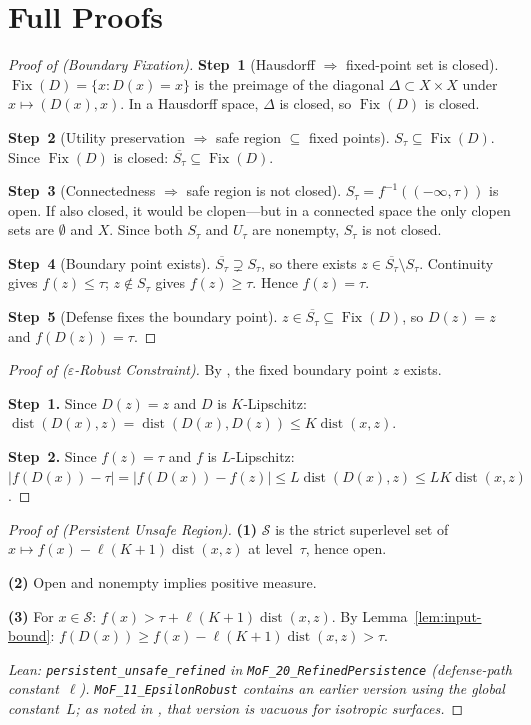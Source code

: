 \documentclass[11pt]{article}
\newcommand{\cl}[1]{\overline{#1}}
\newcommand{\Fix}{\operatorname{Fix}}
\newcommand{\dist}{\operatorname{dist}}
\begin{document}
\section{Full Proofs}
\label{app:proofs}

\begin{proof}[Proof of  (Boundary Fixation)]
\textbf{Step~1} (Hausdorff $\Rightarrow$ fixed-point set is closed).
$\Fix(D) = \{x : D(x) = x\}$ is the preimage of the diagonal
$\Delta \subset X \times X$ under $x \mapsto (D(x), x)$. In a
Hausdorff space, $\Delta$ is closed, so $\Fix(D)$ is closed.

\textbf{Step~2} (Utility preservation $\Rightarrow$ safe region
$\subseteq$ fixed points).
$S_\tau \subseteq \Fix(D)$. Since $\Fix(D)$ is closed:
$\cl{S_\tau} \subseteq \Fix(D)$.

\textbf{Step~3} (Connectedness $\Rightarrow$ safe region is not closed).
$S_\tau = f^{-1}((-\infty,\tau))$ is open. If also closed, it would be
clopen---but in a connected space the only clopen sets are $\emptyset$
and $X$. Since both $S_\tau$ and $U_\tau$ are nonempty, $S_\tau$ is not
closed.

\textbf{Step~4} (Boundary point exists).
$\cl{S_\tau} \supsetneq S_\tau$, so there exists
$z \in \cl{S_\tau} \setminus S_\tau$. Continuity gives
$f(z) \leq \tau$; $z \notin S_\tau$ gives $f(z) \geq \tau$. Hence
$f(z) = \tau$.

\textbf{Step~5} (Defense fixes the boundary point).
$z \in \cl{S_\tau} \subseteq \Fix(D)$, so $D(z) = z$ and
$f(D(z)) = \tau$.
\end{proof}

\begin{proof}[Proof of  ($\varepsilon$-Robust Constraint)]
By , the fixed boundary point $z$ exists.

\textbf{Step~1.} Since $D(z) = z$ and $D$ is $K$-Lipschitz:
$\dist(D(x), z) = \dist(D(x), D(z)) \leq K\dist(x, z)$.

\textbf{Step~2.} Since $f(z) = \tau$ and $f$ is $L$-Lipschitz:
$|f(D(x)) - \tau| = |f(D(x)) - f(z)| \leq L\dist(D(x), z) \leq
LK\dist(x, z)$.
\end{proof}

\begin{proof}[Proof of  (Persistent Unsafe Region)]
\textbf{(1)} $\mathcal{S}$ is the strict superlevel set of
$x \mapsto f(x) - \ell(K+1)\dist(x,z)$ at level~$\tau$, hence open.

\textbf{(2)} Open and nonempty implies positive measure.

\textbf{(3)} For $x \in \mathcal{S}$:
$f(x) > \tau + \ell(K+1)\dist(x,z)$. By Lemma~\ref{lem:input-bound}:
$f(D(x)) \geq f(x) - \ell(K+1)\dist(x,z) > \tau$.

\noindent\emph{Lean:
\textup{\texttt{persistent\_unsafe\_refined}} in
\textup{\texttt{MoF\_20\_RefinedPersistence}}
(defense-path constant~$\ell$).
\textup{\texttt{MoF\_11\_EpsilonRobust}} contains an earlier version
using the global constant~$L$; as noted in
, that version is vacuous for isotropic surfaces.}
\end{proof}
\end{document}
